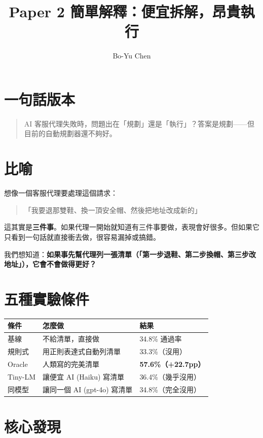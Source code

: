 \documentclass[11pt,a4paper]{article}
\title{\textbf{Paper 2 簡單解釋：便宜拆解，昂貴執行}}
\author{Bo-Yu Chen}
\date{}
\begin{document}
\maketitle

\section*{一句話版本}

\begin{quote}
AI 客服代理失敗時，問題出在「規劃」還是「執行」？答案是規劃——但目前的自動規劃器還不夠好。
\end{quote}

\section*{比喻}

想像一個客服代理要處理這個請求：

\begin{quote}
「我要退那雙鞋、換一頂安全帽、然後把地址改成新的」
\end{quote}

這其實是\textbf{三件事}。如果代理一開始就知道有三件事要做，表現會好很多。但如果它只看到一句話就直接衝去做，很容易漏掉或搞錯。

我們想知道：\textbf{如果事先幫代理列一張清單（「第一步退鞋、第二步換帽、第三步改地址」），它會不會做得更好？}

\section*{五種實驗條件}

\begin{center}
\begin{tabular}{lll}
\toprule
\textbf{條件} & \textbf{怎麼做} & \textbf{結果} \\
\midrule
基線 & 不給清單，直接做 & 34.8\% 通過率 \\
規則式 & 用正則表達式自動列清單 & 33.3\%（沒用） \\
Oracle & 人類寫的完美清單 & \textbf{57.6\%（+22.7pp）} \\
Tiny-LM & 讓便宜 AI (Haiku) 寫清單 & 36.4\%（幾乎沒用） \\
同模型 & 讓同一個 AI (gpt-4o) 寫清單 & 34.8\%（完全沒用） \\
\bottomrule
\end{tabular}
\end{center}

\section*{核心發現}
\end{document}
